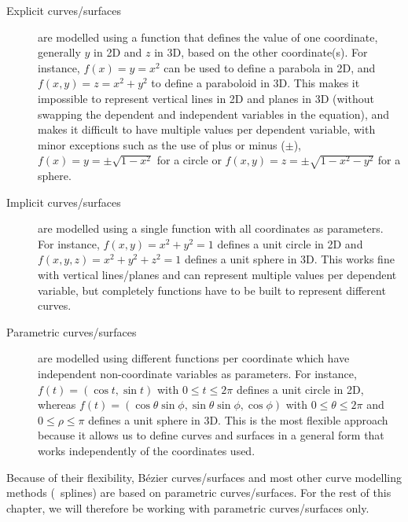 \begin{description}
\item[Explicit curves/surfaces] are modelled using a function that defines the value of one coordinate, generally \(y\) in 2D and \(z\) in 3D, based on the other coordinate(s).
For instance, \(f(x)=y=x^2\) can be used to define a parabola in 2D, and \(f(x,y)=z=x^2+y^2\) to define a paraboloid in 3D.
This makes it impossible to represent vertical lines in 2D and planes in 3D (without swapping the dependent and independent variables in the equation), and makes it difficult to have multiple values per dependent variable, with minor exceptions such as the use of plus or minus (\(\pm\)), \eg\ \(f(x)=y = \pm\sqrt{1-x^2}\) for a circle or \(f(x,y)=z = \pm\sqrt{1-x^2-y^2}\) for a sphere.

\item[Implicit curves/surfaces] are modelled using a single function with all coordinates as parameters.
For instance, \(f(x,y) = x^2+y^2=1\) defines a unit circle in 2D and \(f(x,y,z)=x^2+y^2+z^2=1\) defines a unit sphere in 3D.
This works fine with vertical lines/planes and can represent multiple values per dependent variable, but completely functions have to be built to represent different curves.

\item[Parametric curves/surfaces] are modelled using different functions per coordinate which have independent non-coordinate variables as parameters.
For instance, \(f(t) = (\cos t, \sin t)\) with \(0 \leq t \leq 2\pi \) defines a unit circle in 2D, whereas \(f(t) = (\cos \theta \sin \phi , \sin \theta \sin \phi, \cos \phi)\) with \(0 \leq \theta \leq 2\pi \) and \(0 \leq \rho \leq \pi \) defines a unit sphere in 3D.
This is the most flexible approach because it allows us to define curves and surfaces in a general form that works independently of the coordinates used. 
\end{description}

Because of their flexibility, B\'ezier curves/surfaces and most other curve modelling methods (\eg\ splines) are based on parametric curves/surfaces.
For the rest of this chapter, we will therefore be working with parametric curves/surfaces only.

